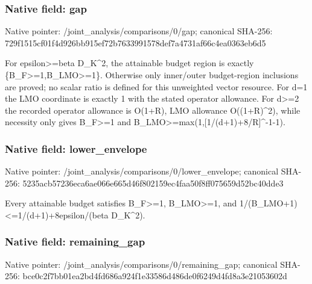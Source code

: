 \documentclass[10pt,a4paper]{article}
\begin{document}
\subsubsection{Native field: gap}
Native pointer: /joint\_\allowbreak{}analysis/comparisons/0/gap; canonical SHA-256: 729f1515cf01f4d926bb915ef72b7633991578def7a4731af66c4ea0363eb6d5

\begingroup\raggedright\sloppy For epsilon>=\allowbreak{}beta D\_\allowbreak{}K\textasciicircum{}2,\allowbreak{} the attainable budget region is exactly \{B\_\allowbreak{}F>=\allowbreak{}1,\allowbreak{}B\_\allowbreak{}LMO>=\allowbreak{}1\}. Otherwise only inner/\allowbreak{}outer budget-region inclusions are proved;\allowbreak{} no scalar ratio is defined for this unweighted vector resource. For d=\allowbreak{}1 the LMO coordinate is exactly 1 with the stated operator allowance. For d>=\allowbreak{}2 the recorded operator allowance is O(1+R),\allowbreak{} LMO allowance O((1+R)\textasciicircum{}2),\allowbreak{} while necessity only gives B\_\allowbreak{}F>=\allowbreak{}1 and B\_\allowbreak{}LMO>=\allowbreak{}max(1,\allowbreak{}[1/\allowbreak{}(d+1)+8/\allowbreak{}R]\textasciicircum{}-1-1).\par\endgroup

\subsubsection{Native field: lower\_\allowbreak{}envelope}
Native pointer: /joint\_\allowbreak{}analysis/comparisons/0/lower\_\allowbreak{}envelope; canonical SHA-256: 5235acb57236eca6ae066e665d46f802159ec4faa50f8ff075659d52bc40dde3

\begingroup\raggedright\sloppy Every attainable budget satisfies B\_\allowbreak{}F>=\allowbreak{}1,\allowbreak{} B\_\allowbreak{}LMO>=\allowbreak{}1,\allowbreak{} and 1/\allowbreak{}(B\_\allowbreak{}LMO+1)<=\allowbreak{}1/\allowbreak{}(d+1)+8epsilon/\allowbreak{}(beta D\_\allowbreak{}K\textasciicircum{}2).\par\endgroup

\subsubsection{Native field: remaining\_\allowbreak{}gap}
Native pointer: /joint\_\allowbreak{}analysis/comparisons/0/remaining\_\allowbreak{}gap; canonical SHA-256: bce0c2f7bb01ea2bd4fd686a924f1e33586d486de0f6249d4fd8a3e21053602d
\end{document}
